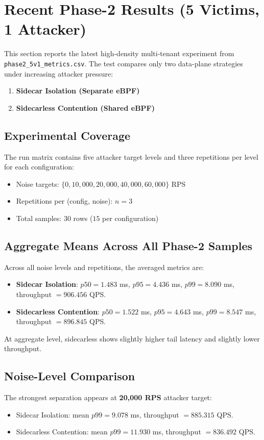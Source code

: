 \section{Recent Phase-2 Results (5 Victims, 1 Attacker)}
This section reports the latest high-density multi-tenant experiment from \texttt{phase2\_5v1\_metrics.csv}. The test compares only two data-plane strategies under increasing attacker pressure:
\begin{enumerate}
  \item \textbf{Sidecar Isolation (Separate eBPF)}
  \item \textbf{Sidecarless Contention (Shared eBPF)}
\end{enumerate}

\subsection{Experimental Coverage}
The run matrix contains five attacker target levels and three repetitions per level for each configuration:
\begin{itemize}
  \item Noise targets: $\{0, 10{,}000, 20{,}000, 40{,}000, 60{,}000\}$ RPS
  \item Repetitions per (config, noise): $n=3$
  \item Total samples: $30$ rows ($15$ per configuration)
\end{itemize}

\subsection{Aggregate Means Across All Phase-2 Samples}
Across all noise levels and repetitions, the averaged metrics are:
\begin{itemize}
  \item \textbf{Sidecar Isolation}: $p50=1.483$ ms, $p95=4.436$ ms, $p99=8.090$ ms, throughput $=906.456$ QPS.
  \item \textbf{Sidecarless Contention}: $p50=1.522$ ms, $p95=4.643$ ms, $p99=8.547$ ms, throughput $=896.845$ QPS.
\end{itemize}

At aggregate level, sidecarless shows slightly higher tail latency and slightly lower throughput.

\subsection{Noise-Level Comparison}
The strongest separation appears at \textbf{20,000 RPS} attacker target:
\begin{itemize}
  \item Sidecar Isolation: mean $p99=9.078$ ms, throughput $=885.315$ QPS.
  \item Sidecarless Contention: mean $p99=11.930$ ms, throughput $=836.492$ QPS.
\end{itemize}

